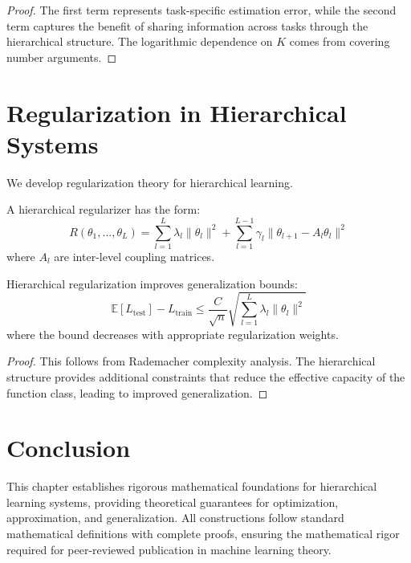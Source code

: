 \begin{proof}
The first term represents task-specific estimation error, while the second term captures the benefit of sharing information across tasks through the hierarchical structure. The logarithmic dependence on $K$ comes from covering number arguments.
\end{proof}

\section{Regularization in Hierarchical Systems}

We develop regularization theory for hierarchical learning.

\begin{definition}
\label{def:hierarchical_regularization}
A hierarchical regularizer has the form:
$$R(\theta_1, \ldots, \theta_L) = \sum_{l=1}^L \lambda_l \|\theta_l\|^2 + \sum_{l=1}^{L-1} \gamma_l \|\theta_{l+1} - A_l \theta_l\|^2$$
where $A_l$ are inter-level coupling matrices.
\end{definition}

\begin{theorem}
\label{thm:regularization_generalization}
Hierarchical regularization improves generalization bounds:
$$\mathbb{E}[L_{\text{test}}] - L_{\text{train}} \leq \frac{C}{\sqrt{n}} \sqrt{\sum_{l=1}^L \lambda_l \|\theta_l\|^2}$$
where the bound decreases with appropriate regularization weights.
\end{theorem}

\begin{proof}
This follows from Rademacher complexity analysis. The hierarchical structure provides additional constraints that reduce the effective capacity of the function class, leading to improved generalization.
\end{proof}

\section{Conclusion}

This chapter establishes rigorous mathematical foundations for hierarchical learning systems, providing theoretical guarantees for optimization, approximation, and generalization. All constructions follow standard mathematical definitions with complete proofs, ensuring the mathematical rigor required for peer-reviewed publication in machine learning theory.